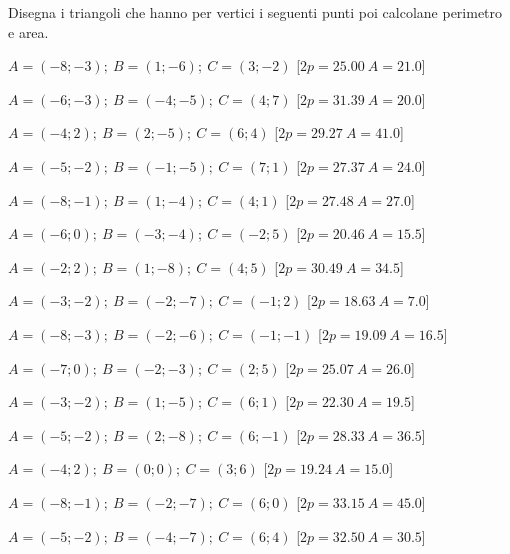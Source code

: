 \begin{esercizio}\label{ese:03.1}
Disegna i triangoli che hanno per vertici i seguenti punti
poi calcolane perimetro e area.
 \begin{enumeratea}
  \item $ A=(-8; -3); ~B=(1; -6); ~C=(3; -2)$ \hfill [$2p=25.00 ~A=21.0$]
  \item $ A=(-6; -3); ~B=(-4; -5); ~C=(4; 7)$ \hfill [$2p=31.39 ~A=20.0$]
  \item $ A=(-4; 2); ~B=(2; -5); ~C=(6; 4)$ \hfill [$2p=29.27 ~A=41.0$]
  \item $ A=(-5; -2); ~B=(-1; -5); ~C=(7; 1)$ \hfill [$2p=27.37 ~A=24.0$]
  \item $ A=(-8; -1); ~B=(1; -4); ~C=(4; 1)$ \hfill [$2p=27.48 ~A=27.0$]
  \item $ A=(-6; 0); ~B=(-3; -4); ~C=(-2; 5)$ \hfill [$2p=20.46 ~A=15.5$]
  \item $ A=(-2; 2); ~B=(1; -8); ~C=(4; 5)$ \hfill [$2p=30.49 ~A=34.5$]
  \item $ A=(-3; -2); ~B=(-2; -7); ~C=(-1; 2)$ \hfill [$2p=18.63 ~A=7.0$]
  \item $ A=(-8; -3); ~B=(-2; -6); ~C=(-1; -1)$ \hfill [$2p=19.09 ~A=16.5$]
  \item $ A=(-7; 0); ~B=(-2; -3); ~C=(2; 5)$ \hfill [$2p=25.07 ~A=26.0$]
  \item $ A=(-3; -2); ~B=(1; -5); ~C=(6; 1)$ \hfill [$2p=22.30 ~A=19.5$]
  \item $ A=(-5; -2); ~B=(2; -8); ~C=(6; -1)$ \hfill [$2p=28.33 ~A=36.5$]
  \item $ A=(-4; 2); ~B=(0; 0); ~C=(3; 6)$ \hfill [$2p=19.24 ~A=15.0$]
  \item $ A=(-8; -1); ~B=(-2; -7); ~C=(6; 0)$ \hfill [$2p=33.15 ~A=45.0$]
  \item $ A=(-5; -2); ~B=(-4; -7); ~C=(6; 4)$ \hfill [$2p=32.50 ~A=30.5$]
 \end{enumeratea}
\end{esercizio}

